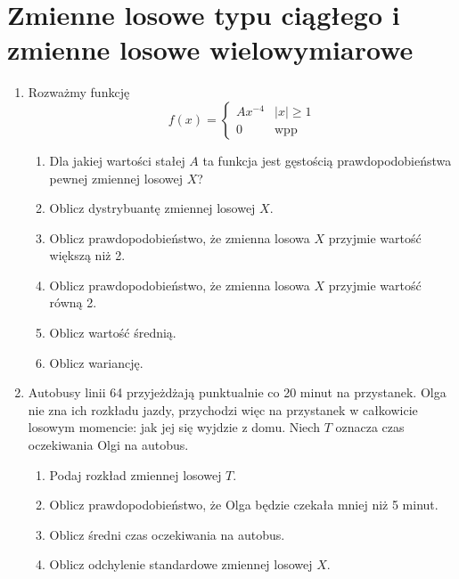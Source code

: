 \documentclass{mwart}
\newcommand{\ans}[1]{}
\begin{document}
\clearpage
\section{Zmienne losowe typu ciągłego i zmienne losowe wielowymiarowe}
\begin{enumerate}
\item Rozważmy funkcję \[f(x)=\begin{cases} Ax^{-4} & \left|x\right|\geq 1 \\ 0 & \text{wpp} \end{cases} \]
\begin{enumerate}
\item Dla jakiej wartości stałej $A$ ta funkcja jest gęstością prawdopodobieństwa pewnej zmiennej losowej $X$? \ans{$\frac{3}{2}$}
\item Oblicz dystrybuantę zmiennej losowej $X$. \ans{\[\begin{cases}-\frac{x^{-3}}{2} & x\leq-1\\\frac{1}{2} & -1<x\leq1\\1-\frac{x^{-3}}{2} & x>1 \end{cases}\]}
\item Oblicz prawdopodobieństwo, że zmienna losowa $X$ przyjmie wartość większą niż 2. \ans{$\frac{1}{16}$}
\item Oblicz prawdopodobieństwo, że zmienna losowa $X$ przyjmie wartość równą 2. \ans{$0$}
\item Oblicz wartość średnią. \ans{$0$}
\item Oblicz wariancję. \ans{$3$}
\end{enumerate}
\item Autobusy linii 64 przyjeżdżają punktualnie co 20 minut na przystanek. Olga nie zna ich rozkładu jazdy, przychodzi więc na przystanek w całkowicie losowym momencie: jak jej się wyjdzie z domu. Niech $T$ oznacza czas oczekiwania Olgi na autobus.
\begin{enumerate}
\item Podaj rozkład zmiennej losowej $T$. \ans{$f(t)=\begin{cases}\frac{1}{20} & 0\leq t\leq 20 \\ 0 & \text{wpp} \end{cases}$}
\item Oblicz prawdopodobieństwo, że Olga będzie czekała mniej niż 5 minut. \ans{$P(T<5)=F(5)=0{,}25$}
\item Oblicz średni czas oczekiwania na autobus. \ans{$ET=10$}
\item Oblicz odchylenie standardowe zmiennej losowej $X$. \ans{$DT=\sqrt{\frac{400}{12}}$}

\end{enumerate}
\end{enumerate}
\end{document}
